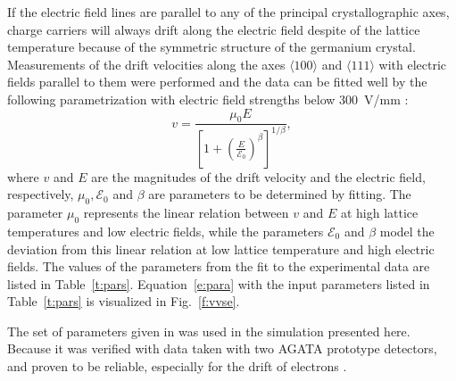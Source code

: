 \documentclass[epj,referee]{svjour}
\begin{document}
If the electric field lines are parallel to any of the principal
crystallographic axes, charge carriers will always drift along the
electric field despite of the lattice temperature because of the
symmetric structure of the germanium crystal. Measurements of the
drift velocities along the axes $\langle 100 \rangle$ and $\langle 111
\rangle$ with electric fields parallel to them were performed
\cite{miha,reg,bart} and the data can be fitted well by the following
parametrization \cite{Kno99} with electric field strengths below
300~V/mm \cite{miha}:
\begin{equation} 
\label{e:para} 
v = \frac{\mu_{0}E}{[1+(\frac{E}{\mathcal{E}_{0}})^{\beta}]^{1/\beta}}, 
\end{equation} 
where $v$ and $E$ are the magnitudes of the drift velocity and the
electric field, respectively, $\mu_{0},\mathcal{E}_{0}$ and $\beta$
are parameters to be determined by fitting. The parameter $\mu_{0}$
represents the linear relation between $v$ and $E$ at high lattice
temperatures and low electric fields, while the parameters
$\mathcal{E}_{0}$ and $\beta$ model the deviation from this linear
relation at low lattice temperature and high electric fields. The
values of the parameters from the fit to the experimental data are
listed in Table~\ref{t:pars}. Equation~\ref{e:para} with the input
parameters listed in Table~\ref{t:pars} is visualized in
Fig.~\ref{f:vvse}.

The set of parameters given in \cite{bart} was used in the simulation
presented here. Because it was verified with data taken with two AGATA
\cite{agata} prototype detectors, and proven to be reliable,
especially for the drift of electrons \cite{bart2}.
 
\end{document}
